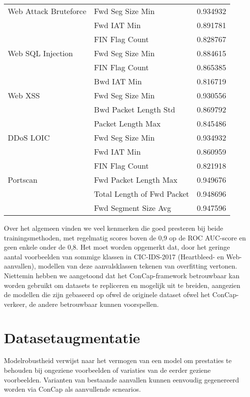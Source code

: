 \documentclass[conference]{IEEEtran}
\begin{document}
\begin{table}
\begin{tabular}{ m{10em}  m{10em} m{8em} }
			\midrule
			Web Attack Bruteforce & Fwd Seg Size Min & 0.934932\\
			{} & Fwd IAT Min & 0.891781\\
			{} & FIN Flag Count & 0.828767\\
			\midrule
			Web SQL Injection & Fwd Seg Size Min & 0.884615\\
			{} & FIN Flag Count & 0.865385\\
			{} & Bwd IAT Min & 0.816719\\
			\midrule
			Web XSS & Fwd Seg Size Min & 0.930556\\
			{} &  Bwd Packet Length Std & 0.869792\\
			{} & Packet Length Max & 0.845486\\
			\midrule
			DDoS LOIC & Fwd Seg Size Min & 0.934932\\
			{} & Fwd IAT Min & 0.860959\\
			{} & FIN Flag Count & 0.821918\\
			\midrule
			Portscan & Fwd Packet Length Max & 0.949676\\
			{} & Total Length of Fwd Packet & 0.948696\\
			{} & Fwd Segment Size Avg & 0.947596\\
			\midrule
		\end{tabular}
		\label{tab:results}
	\end{table}
	
	Over het algemeen vinden we veel kenmerken die goed presteren bij beide trainingsmethoden, met regelmatig scores boven de 0,9 op de ROC AUC-score en geen enkele onder de 0,8. Het moet worden opgemerkt dat, door het geringe aantal voorbeelden van sommige klassen in CIC-IDS-2017 (Heartbleed- en Web-aanvallen), modellen van deze aanvalsklassen tekenen van overfitting vertonen. Niettemin hebben we aangetoond dat het ConCap-framework betrouwbaar kan worden gebruikt om datasets te repliceren en mogelijk uit te breiden, aangezien de modellen die zijn gebaseerd op ofwel de originele dataset ofwel het ConCap-verkeer, de andere betrouwbaar kunnen voorspellen.
	
	\section{Datasetaugmentatie}\label{augmentation}
	Modelrobustheid verwijst naar het vermogen van een model om prestaties te behouden bij ongeziene voorbeelden of variaties van de eerder geziene voorbeelden. Varianten van bestaande aanvallen kunnen eenvoudig gegenereerd worden via ConCap als aanvullende scnearios. 
	
\end{document}

